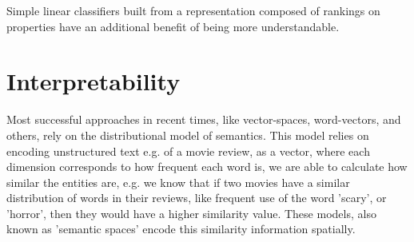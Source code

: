 Simple linear classifiers built from a representation composed of rankings on properties have an additional benefit of being more understandable.







%

\section{Interpretability}



Most successful approaches in recent times, like vector-spaces, word-vectors, and others, rely on the distributional model of semantics. This model relies on encoding unstructured text e.g. of a movie review, as a vector, where each dimension corresponds to how frequent each word is, we are able to calculate how similar the entities are, e.g. we know that if two movies have a similar distribution of words in their reviews, like frequent use of the word 'scary', or 'horror', then they would have a higher similarity value. These models, also known as 'semantic spaces' encode this similarity information spatially.

